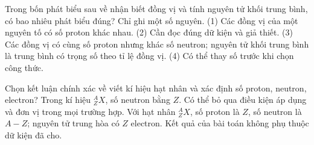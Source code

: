 \begin{ex}
Trong bốn phát biểu sau về nhận biết đồng vị và tính nguyên tử khối trung bình, có bao nhiêu phát biểu đúng? Chỉ ghi một số nguyên. (1) Các đồng vị của một nguyên tố có số proton khác nhau. (2) Cần đọc đúng dữ kiện và giả thiết. (3) Các đồng vị có cùng số proton nhưng khác số neutron; nguyên tử khối trung bình là trung bình có trọng số theo tỉ lệ đồng vị. (4) Có thể thay số trước khi chọn công thức.
\end{ex}

\begin{ex}
Chọn kết luận chính xác về viết kí hiệu hạt nhân và xác định số proton, neutron, electron?
\choice
{Trong kí hiệu $^{A}_{Z}X$, số neutron bằng $Z$.}
{Có thể bỏ qua điều kiện áp dụng và đơn vị trong mọi trường hợp.}
{\True Với hạt nhân $^{A}_{Z}X$, số proton là $Z$, số neutron là $A-Z$; nguyên tử trung hòa có $Z$ electron.}
{Kết quả của bài toán không phụ thuộc dữ kiện đã cho.}
\end{ex}

